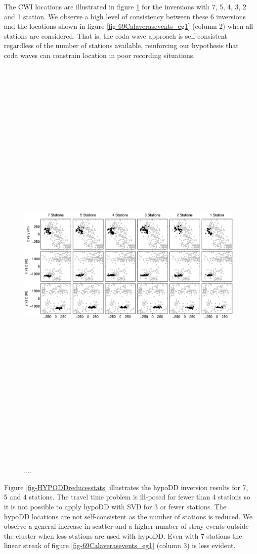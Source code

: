 \documentclass[extra]{gji}
\begin{document}
The CWI locations are illustrated in figure
\ref{fig-CWIreducesstats} for the inversions with 7, 5, 4, 3, 2 and
1 station. We observe a high level of consistency between these 6
inversions and the locations shown in figure
\ref{fig-69Calaverasevents_eg1} (column 2) when all stations are
considered. That is, the coda wave approach is self-consistent
regardless of the number of stations available, reinforcing our
hypothesis that coda waves can constrain location in poor recording
situations.

\begin{figure}
\includegraphics[angle=90,height = 50pc]{diags/CalaverasLoc2.eps}
\caption{....} \label{fig-CWIreducesstats}
\end{figure}


Figure \ref{fig-HYPODDreducesstats} illustrates the hypoDD inversion
results for 7, 5 and 4 stations. The travel time problem is
ill-posed for fewer than 4 stations so it is not possible to apply
hypoDD with SVD for 3 or fewer stations.  The hypoDD locations are
not self-consistent as the number of stations is reduced. We observe
a general increase in scatter and a higher number of stray events
outside the cluster when less stations are used with hypoDD. Even
with 7 stations the linear streak of figure
\ref{fig-69Calaverasevents_eg1} (column 3) is less evident.

\end{document}
